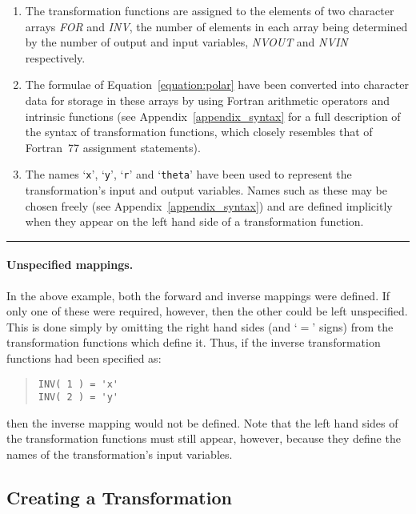 \documentclass[twoside,11pt]{article}
\newcommand{\xlabel}[1]{}
\newcommand{\fortvar}[1]{\mbox{\emph{#1}}}
\newcommand{\exampledone}[0]{\begin{center} \rule{6em}{0.2mm} \end{center}}
\begin{document}
\begin{enumerate}

\item  The transformation functions are assigned to the elements of two
character arrays \fortvar{FOR} and \fortvar{INV}, the number of elements in
each array being determined by the number of output and input variables,
\fortvar{NVOUT} and \fortvar{NVIN} respectively. 

\item The formulae of Equation~\ref{equation:polar} have been converted into
character data for storage in these arrays by using Fortran arithmetic
operators and intrinsic functions (see Appendix~\ref{appendix_syntax} for a
full description of the syntax of transformation functions, which closely
resembles that of Fortran~77 assignment statements). 

\item The names `\verb#x#', `\verb#y#', `\verb#r#' and `\verb#theta#' have
been used to represent the transformation's input and output variables. 
Names such as these may be chosen freely (see
Appendix~\ref{appendix_syntax}) and are defined implicitly when they appear
on the left hand side of a transformation function. 

\end{enumerate}
\exampledone

\paragraph{Unspecified mappings.}
In the above example, both the forward and inverse mappings were defined. 
If only one of these were required, however, then the other could be left
unspecified. 
This is done simply by omitting the right hand sides (and `$=$' signs) from
the transformation functions which define it. 
Thus, if the inverse transformation functions had been specified as:

\begin{quote}
\begin{verbatim}
INV( 1 ) = 'x'
INV( 2 ) = 'y'
\end{verbatim}
\end{quote}

then the inverse mapping would not be defined.
Note that the left hand sides of the transformation functions must still
appear, however, because they define the names of the transformation's input
variables. 


\subsection{\xlabel{creating_a_transformation}Creating a Transformation}
\label{section:simple:creating}
\end{document}

